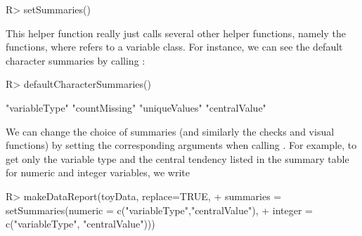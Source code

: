 \documentclass[article,shortnames]{jss}
\begin{document}
\begin{Schunk}
\begin{Sinput}
R> setSummaries()
\end{Sinput}
\end{Schunk}

This helper function really just calls several other helper functions, namely the \\ 
 functions, where  refers to a variable class. For instance, we can see the default character summaries  by calling :

\begin{Schunk}
\begin{Sinput}
R> defaultCharacterSummaries()
\end{Sinput}
\begin{Soutput}
[1] "variableType" "countMissing" "uniqueValues" "centralValue"
\end{Soutput}
\end{Schunk}

We can change the choice of summaries (and similarly the checks and visual functions) by setting the
corresponding arguments when calling . For example, to get
only the variable type and the central tendency listed in the summary
table for numeric and integer variables, we write

\begin{Schunk}
\begin{Sinput}
R> makeDataReport(toyData, replace=TRUE,
+    summaries = setSummaries(numeric = c("variableType","centralValue"),
+    integer = c("variableType", "centralValue")))
\end{Sinput}
\end{Schunk}
\end{document}
